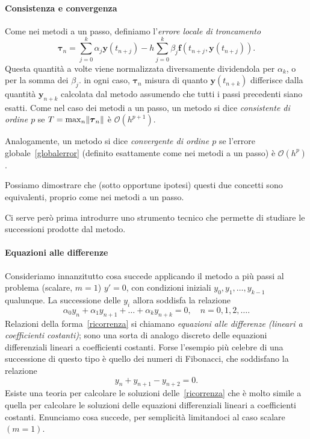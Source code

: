 \documentclass[a4paper]{report}
\DeclarePairedDelimiter{\norm}{\lVert}{\rVert}
\theoremstyle{definiton}
\theoremstyle{remark}
\newcommand{\y}{\mathbf{y}}
\newcommand{\f}{\mathbf{f}}
\begin{document}
\paragraph{Consistenza e convergenza}

Come nei metodi a un passo, definiamo l'\emph{errore locale di troncamento}
\[
\boldsymbol{\tau}_n = \sum_{j=0}^k \alpha_j \y(t_{n+j}) - h\sum_{j=0}^k \beta_j \f(t_{n+j}, \y(t_{n+j})).
\]
Questa quantità a volte viene normalizzata diversamente dividendola per $\alpha_k$, o per la somma dei $\beta_j$. in ogni caso, $\boldsymbol{\tau}_n$ misura di quanto $\y(t_{n+k})$ differisce dalla quantità $\y_{n+k}$ calcolata dal metodo assumendo che tutti i passi precedenti siano esatti. Come nel caso dei metodi a un passo, un metodo si dice \emph{consistente di ordine $p$} se $T = \max_{n} \norm{\boldsymbol{\tau}_n}$ è $\mathcal{O}(h^{p+1})$.

Analogamente, un metodo si dice \emph{convergente di ordine $p$} se l'errore globale~\eqref{globalerror} (definito esattamente come nei metodi a un passo) è $\mathcal{O}(h^p)$.

Possiamo dimostrare che (sotto opportune ipotesi) questi due concetti sono equivalenti, proprio come nei metodi a un passo.

Ci serve però prima introdurre uno strumento tecnico che permette di studiare le successioni prodotte dal metodo.

\paragraph{Equazioni alle differenze}

Consideriamo innanzitutto cosa succede applicando il metodo a più passi al problema (scalare, $m=1$) $y'=0$, con condizioni iniziali $y_0,y_1,\dots,y_{k-1}$ qualunque. La successione delle $y_i$ allora soddisfa la relazione
\begin{equation} \label{ricorrenza}
    \alpha_0 y_n + \alpha_1 y_{n+1} + \dots + \alpha_k y_{n+k} = 0, \quad n = 0,1,2,\dots.
\end{equation}
Relazioni della forma~\eqref{ricorrenza} si chiamano \emph{equazioni alle differenze (lineari a coefficienti costanti)}; sono una sorta di analogo discreto delle equazioni differenziali lineari a coefficienti costanti. Forse l'esempio più celebre di una successione di questo tipo è quello dei numeri di Fibonacci, che soddisfano la relazione
\[
y_n + y_{n+1} - y_{n+2} = 0.
\]
Esiste una teoria per calcolare le soluzioni delle~\eqref{ricorrenza} che è molto simile a quella per calcolare le soluzioni delle equazioni differenziali lineari a coefficienti costanti. Enunciamo cosa succede, per semplicità limitandoci al caso scalare $(m=1)$.
\end{document}

